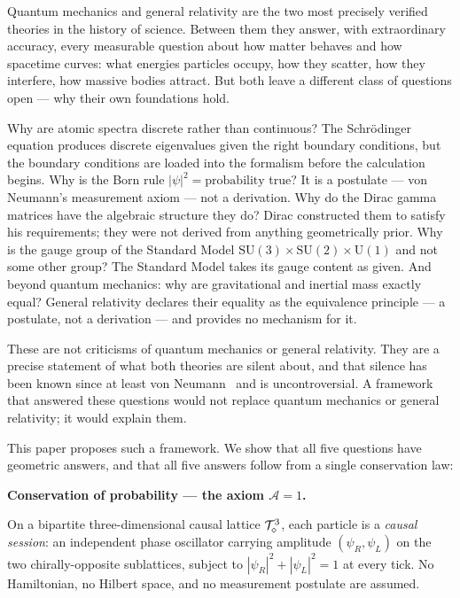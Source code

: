 
Quantum mechanics and general relativity are the two most precisely
verified theories in the history of science.
Between them they answer, with extraordinary accuracy, every measurable
question about how matter behaves and how spacetime curves: what energies
particles occupy, how they scatter, how they interfere, how massive bodies
attract.
But both leave a different class of questions open ---
why their own foundations hold.

Why are atomic spectra discrete rather than continuous?
The Schr\"odinger equation produces discrete eigenvalues given the right
boundary conditions, but the boundary conditions are loaded into the
formalism before the calculation begins.
Why is the Born rule $|\psi|^2 = \text{probability}$ true?
It is a postulate --- von Neumann's measurement axiom --- not a derivation.
Why do the Dirac gamma matrices have the algebraic structure they do?
Dirac constructed them to satisfy his requirements; they were
not derived from anything geometrically prior.
Why is the gauge group of the Standard Model $\mathrm{SU}(3)\times
\mathrm{SU}(2)\times\mathrm{U}(1)$ and not some other group?
The Standard Model takes its gauge content as given.
And beyond quantum mechanics: why are gravitational and inertial mass
exactly equal?
General relativity declares their equality as the equivalence principle
--- a postulate, not a derivation --- and provides no mechanism for it.

These are not criticisms of quantum mechanics or general relativity.
They are a precise statement of what both theories are silent about,
and that silence has been known since at least
von Neumann~\cite{vonneumann1932} and is uncontroversial.
A framework that answered these questions would not replace quantum
mechanics or general relativity; it would explain them.

\medskip

This paper proposes such a framework.
We show that all five questions have geometric answers, and that all five
answers follow from a single conservation law:

\begin{center}
\textbf{Conservation of probability --- the axiom $\mathcal{A}=1$.}
\end{center}

On a bipartite three-dimensional causal lattice $\mathcal{T}_\diamond^3$,
each particle is a \emph{causal session}: an independent phase oscillator
carrying amplitude $(\psi_R, \psi_L)$ on the two chirally-opposite
sublattices, subject to $|\psi_R|^2 + |\psi_L|^2 = 1$ at every tick.
No Hamiltonian, no Hilbert space, and no measurement postulate are
assumed.

